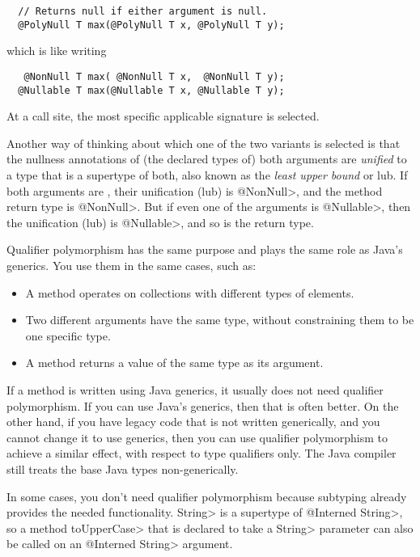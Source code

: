\begin{Verbatim}
  // Returns null if either argument is null.
  @PolyNull T max(@PolyNull T x, @PolyNull T y);
\end{Verbatim}

\noindent
which is like writing

\begin{Verbatim}
   @NonNull T max( @NonNull T x,  @NonNull T y);
  @Nullable T max(@Nullable T x, @Nullable T y);
\end{Verbatim}

\noindent
At a call site, the most specific applicable signature is selected.

Another way of thinking about which one of the two  variants is
selected is that the nullness annotations of (the declared types of) both
arguments are \emph{unified} to a type that is a supertype of both, also
known as the \emph{least upper bound} or lub.  If both
arguments are , their unification (lub) is \<@NonNull>, and the
method return type is \<@NonNull>.  But if even one of the arguments is \<@Nullable>,
then the unification (lub) is \<@Nullable>, and so is the return type.




Qualifier polymorphism has the same purpose and plays the same role as
Java's generics.  You use them in the same cases, such as:
\begin{itemize}
\item
  A method operates on collections with different types of
  elements.
\item
  Two different arguments have the same type, without constraining them to
  be one specific type.
\item
  A method returns a value of the same type as its argument.
\end{itemize}


If a method is written using Java generics, it usually does not need
qualifier polymorphism.  If you can use Java's generics, then that is often
better.  On the other hand, if you have legacy code that is not
written generically, and you cannot change it to use generics, then you can
use qualifier polymorphism to achieve a similar effect, with respect to
type qualifiers only.  The Java compiler still treats the base Java types
non-generically.

In some cases, you don't need qualifier polymorphism because subtyping
already provides the needed functionality.
\<String> is a supertype of \<@Interned String>, so a method \<toUpperCase>
that is declared to take a \<String> parameter can also be called on an
\<@Interned String> argument.

